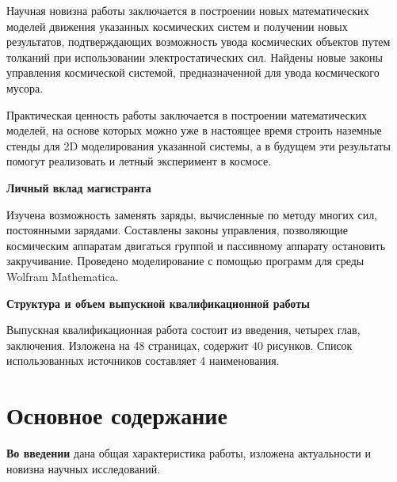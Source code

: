 Научная новизна работы заключается в построении новых математических моделей движения указанных космических систем и получении новых результатов, подтверждающих возможность увода космических объектов путем толканий при использовании электростатических сил. Найдены новые законы управления космической системой, предназначенной для увода космического мусора.

Практическая ценность работы заключается в построении математических моделей, на основе которых можно уже в настоящее время строить наземные стенды для 2D моделирования указанной системы, а в будущем эти результаты помогут реализовать и летный эксперимент в космосе.

\textbf{Личный вклад магистранта}

Изучена возможность заменять заряды, вычисленные по методу многих сил, постоянными зарядами. Составлены законы управления, позволяющие космическим аппаратам двигаться группой и пассивному аппарату остановить закручивание. Проведено моделирование с помощью программ для среды Wolfram Mathematica.

\textbf{Структура и объем выпускной квалификационной работы}

Выпускная квалификационная работа состоит из введения, четырех глав, заключения. Изложена на 48 страницах, содержит 40 рисунков. Список использованных источников составляет 4 наименования.

\section*{Основное содержание}

\textbf{Во введении} дана общая характеристика работы, изложена актуальности и новизна научных исследований.